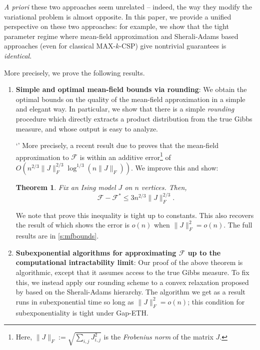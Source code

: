 \documentclass[11pt, oneside, english]{article}
\newcommand{\F}{\mathcal{F}}
\newtheorem{theorem}{Theorem}[section]
\newtheorem*{ntheorem}{Theorem}
\theoremstyle{definition}
\theoremstyle{plain}
\begin{document}
\emph{A priori} these two approaches seem unrelated -- indeed, the way they modify the variational problem is almost opposite. In this paper, we provide a unified perspective on these two approaches: for example, we show that the tight parameter regime where mean-field approximation and Sherali-Adams based approaches (even for classical MAX-$k$-CSP) give nontrivial guarantees is \emph{identical}.

More precisely, we prove the following results. \\ 
\begin{enumerate}
\item {\bf Simple and optimal mean-field bounds via rounding}: We obtain the optimal bounds on the quality of the mean-field approximation in a simple and elegant way. In particular, we show that there is a simple \emph{rounding} procedure which directly extracts a product distribution from the true Gibbs measure, and whose output is easy to analyze.
`'
More precisely, a recent result due to \cite{jain2018mean} proves that the mean-field approximation to $\F$ is within an additive error\footnote{Here, $\|J\|_F := \sqrt{\sum_{i,j}J_{i,j}^2}$ is the \emph{Frobenius norm} of the matrix $J$.} of $O(n^{2/3} \|J\|^{2/3}_F \log^{1/3}(n \|J\|_F))$. We improve this and show:
\begin{theorem}
\label{thm:new-mean-field}
Fix an Ising model $J$ on $n$ vertices. Then,
$$\F - \F^{*} \leq 3n^{2/3} \|J\|_F^{2/3}.$$
\end{theorem}
We note that \cite{jain2018mean} prove this inequality is tight up to constants. This also recovers the result of \cite{basak2017universality} which shows the error is $o(n)$ when $\|J\|_F^2 = o(n)$. The full results are in \cref{s:mfbounds}.  \\
\item {\bf Subexponential algorithms for approximating $\F$ up to the computational intractability limit}: Our proof of the above theorem is algorithmic, except that it assumes access to the true Gibbs measure. To fix this, we instead apply our rounding scheme to a convex relaxation proposed by \cite{risteski2016calculate} based on the Sherali-Adams hierarchy. The algorithm we get as a result runs in subexponential time so long as $\|J\|^2_F = o(n)$; this condition for subexponentiality is tight under Gap-ETH. %

\end{enumerate}
\end{document}
